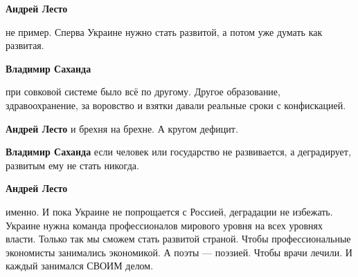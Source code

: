 \begin{itemize}
\begin{itemize}
\textbf{Андрей Лесто} 

не пример. Сперва Украине нужно стать развитой, а потом уже думать как
развитая.


 
\textbf{Владимир Саханда} 

при совковой системе было всё по другому. Другое образование, здравоохранение,
за воровство и взятки давали реальные сроки с конфискацией.

 
\textbf{Андрей Лесто} и брехня на брехне. А кругом дефицит.

 
\textbf{Владимир Саханда} если человек или государство не развивается, а деградирует, развитым ему не стать никогда.

 
\textbf{Андрей Лесто} 

именно. И пока Украине не попрощается с Россией, деградации не избежать.
Украине нужна команда профессионалов мирового уровня на всех уровнях власти.
Только так мы сможем стать развитой страной. Чтобы профессиональные экономисты
занимались экономикой. А поэты — поэзией. Чтобы врачи лечили. И каждый
занимался СВОИМ делом.

 

\end{itemize}
\end{itemize}
